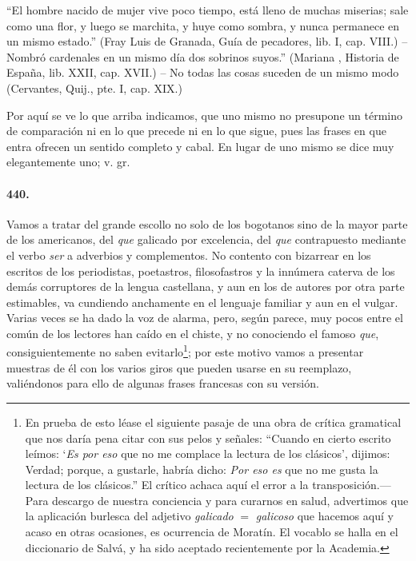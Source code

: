 \documentclass{book}
\begin{document}
“El hombre nacido de mujer vive poco tiempo, está lleno de muchas miserias; sale como una flor, y luego se marchita, y huye como sombra, y nunca permanece en un mismo estado.” (Fray Luis de Granada, Guía de pecadores, lib. I, cap. VIII.) – Nombró cardenales en un mismo día dos sobrinos suyos.” (Mariana , Historia de España, lib. XXII, cap. XVII.) – No todas las cosas suceden de un mismo modo (Cervantes, Quij., pte. I, cap. XIX.)

Por aquí se ve lo que arriba indicamos, que uno mismo no presupone un término de comparación ni en lo que precede ni en lo que sigue, pues las frases en que entra ofrecen un sentido completo y cabal.
En lugar de uno mismo se dice muy elegantemente uno; v. gr.

\paragraph{440.} Vamos a tratar del grande escollo no solo de los bogotanos sino de la mayor 
parte de los americanos, del \emph{que} galicado por excelencia, del \emph{que} contrapuesto mediante el 
verbo \emph{ser} a adverbios y complementos. No contento con bizarrear en los escritos de los periodistas, 
poetastros, filosofastros y la innúmera caterva de los demás corruptores de la lengua 
castellana, y aun en los de autores por otra parte estimables, va cundiendo anchamente en el 
lenguaje familiar y aun en el vulgar. Varias veces se ha dado la voz de alarma, pero, según 
parece, muy pocos entre el común de los lectores han caído en el chiste, y no conociendo el famoso 
\emph{que}, consiguientemente no saben evitarlo\footnote{En prueba de esto léase el siguiente pasaje de
una obra de crítica gramatical que nos daría pena citar con sus pelos y señales: ``Cuando en cierto
escrito leímos: `\emph{Es por eso} que no me complace la lectura de los clásicos', dijimos: Verdad; 
porque, a gustarle, habría dicho: \emph{Por eso es} que no me gusta la lectura de los clásicos.'' El 
crítico achaca aquí el error a la transposición.---Para descargo de nuestra conciencia y para curarnos en 
salud, advertimos que la aplicación burlesca del adjetivo \emph{galicado} $=$ \emph{galicoso} que hacemos 
aquí y acaso en otras ocasiones, es ocurrencia de Moratín. El vocablo se halla en el diccionario de 
Salvá, y ha sido aceptado recientemente por la Academia.}; por este motivo vamos a presentar muestras de 
él 
con los varios giros que pueden usarse en su reemplazo, valiéndonos para ello de algunas frases 
francesas con su versión.
\\
\end{document}
